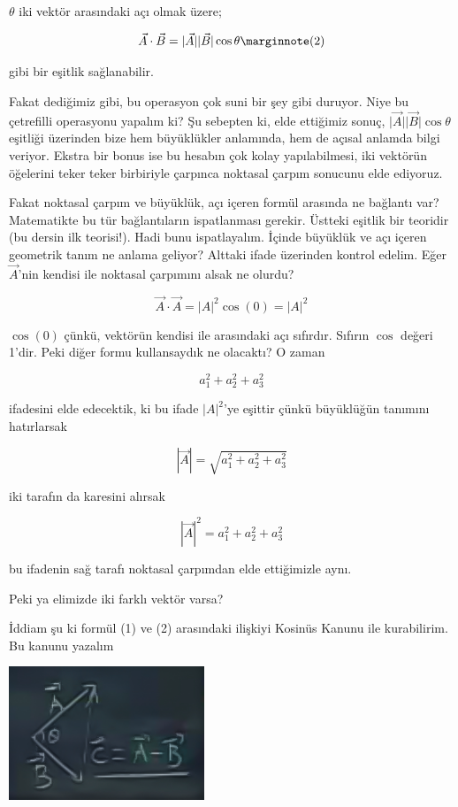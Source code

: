 \documentclass[12pt,fleqn]{article}\usepackage{../../common}
\begin{document}
$\theta$ iki vektör arasındaki açı olmak üzere;

$$
\vec{A} \cdot \vec{B} = |\vec{A}||\vec{B}| \cos \theta 
\mlabel{2}
$$

gibi bir eşitlik sağlanabilir.

Fakat dediğimiz gibi, bu operasyon çok suni bir şey gibi duruyor. Niye bu
çetrefilli operasyonu yapalım ki? Şu sebepten ki, elde ettiğimiz sonuç,
$\vert\vec{A}\vert \vert\vec{B}\vert \cos \theta$ eşitliği üzerinden bize hem
büyüklükler anlamında, hem de açısal anlamda bilgi veriyor. Ekstra bir bonus ise
bu hesabın çok kolay yapılabilmesi, iki vektörün öğelerini teker teker
birbiriyle çarpınca noktasal çarpım sonucunu elde ediyoruz.

Fakat noktasal çarpım ve büyüklük, açı içeren formül arasında ne bağlantı var?
Matematikte bu tür bağlantıların ispatlanması gerekir. Üstteki eşitlik bir
teoridir (bu dersin ilk teorisi!). Hadi bunu ispatlayalım. İçinde büyüklük ve
açı içeren geometrik tanım ne anlama geliyor? Alttaki ifade üzerinden kontrol
edelim. Eğer $\vec{A}$'nin kendisi ile noktasal çarpımını alsak ne olurdu?

$$\vec{A} \cdot \vec{A} = |A|^2\cos(0) = |A|^2$$

$\cos(0)$ çünkü, vektörün kendisi ile arasındaki açı sıfırdır. Sıfırın $\cos$
değeri 1'dir. Peki diğer formu kullansaydık ne olacaktı? O zaman

$$ a_1^2 + a_2^2 + a_3^2 $$

ifadesini elde edecektik, ki bu ifade $|A|^2$'ye eşittir çünkü büyüklüğün
tanımını hatırlarsak

$$ |\vec{A}| = \sqrt{a_1 ^2 + a_2^2 + a_3^2} $$

iki tarafın da karesini alırsak

$$ |\vec{A}|^2 = a_1 ^2 + a_2^2 + a_3^2$$

bu ifadenin sağ tarafı noktasal çarpımdan elde ettiğimizle aynı. 

Peki ya elimizde iki farklı vektör varsa? 

İddiam şu ki formül (1) ve (2) arasındaki ilişkiyi Kosinüs Kanunu ile
kurabilirim. Bu kanunu yazalım

\includegraphics[height=4cm]{1_11.png}
\end{document}
